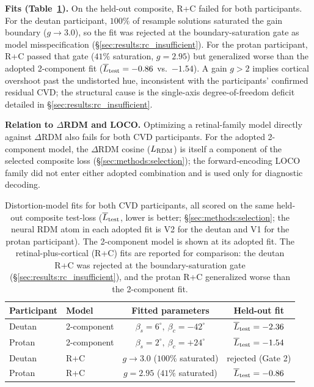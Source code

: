 \textbf{Fits (Table~\ref{tab:modelfits}).} On the held-out composite, R+C failed for both participants. For the deutan participant, $100\%$ of resample solutions saturated the gain boundary ($g \to 3.0$), so the fit was rejected at the boundary-saturation gate as model misspecification (\S\ref{sec:results:rc_insufficient}). For the protan participant, R+C passed that gate ($41\%$ saturation, $g = 2.95$) but generalized worse than the adopted 2-component fit ($\overline{L}_{\rm test} = -0.86$ vs.\ $-1.54$). A gain $g > 2$ implies cortical overshoot past the undistorted hue, inconsistent with the participants' confirmed residual CVD; the structural cause is the single-axis degree-of-freedom deficit detailed in \S\ref{sec:results:rc_insufficient}.

\textbf{Relation to $\Delta$RDM and LOCO.} Optimizing a retinal-family model directly against $\Delta$RDM also fails for both CVD participants. For the adopted 2-component model, the $\Delta$RDM cosine ($L_{\rm RDM}$) is itself a component of the selected composite loss (\S\ref{sec:methods:selection}); the forward-encoding LOCO family did not enter either adopted combination and is used only for diagnostic decoding.

\begin{table}[ht]
  \caption{Distortion-model fits for both CVD participants, all scored on the same held-out composite test-loss ($\overline{L}_{\rm test}$, lower is better; \S\ref{sec:methods:selection}; the neural RDM atom in each adopted fit is V2 for the deutan and V1 for the protan participant). The 2-component model is shown at its adopted fit. The retinal-plus-cortical (R+C) fits are reported for comparison: the deutan R+C was rejected at the boundary-saturation gate (\S\ref{sec:results:rc_insufficient}), and the protan R+C generalized worse than the 2-component fit.}
  \label{tab:modelfits}
  \centering
  \small
  \begin{tabular}{llcc}
    \toprule Participant & Model & Fitted parameters & Held-out fit \\ \midrule
    Deutan & 2-component & $\beta_s = 6^\circ,\ \beta_c = -42^\circ$ & $\overline{L}_{\rm test} = -2.36$ \\
    Protan & 2-component & $\beta_s = 2^\circ,\ \beta_c = +24^\circ$ & $\overline{L}_{\rm test} = -1.54$ \\ \midrule
    Deutan & R+C & $g \to 3.0$ ($100\%$ saturated) & rejected (Gate 2) \\
    Protan & R+C & $g = 2.95$ ($41\%$ saturated) & $\overline{L}_{\rm test} = -0.86$ \\ \bottomrule
  \end{tabular}
\end{table}

